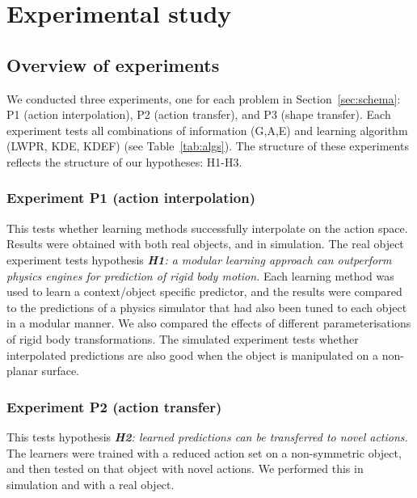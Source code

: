 
\newlength{\barchartwidth}
\setlength{\barchartwidth}{6.5cm}

\section{Experimental study}\label{sec:Experiment}

\subsection{Overview of experiments}\label{sec:Experiment.Overview}

We conducted three experiments, one for each problem in Section~\ref{sec:schema}: P1 (action interpolation), P2 (action transfer), and P3
(shape transfer). Each experiment tests all combinations of information (G,A,E) and learning algorithm (LWPR, KDE, KDEF) (see Table~\ref{tab:algs}). The structure of these experiments reflects the structure of our hypotheses: H1-H3.

\subsubsection{Experiment P1 (action interpolation)} This tests whether learning methods successfully interpolate on the action space. Results were obtained with both real objects, and in simulation. The  real object experiment tests hypothesis {\em {\bf H1}: a modular learning approach can outperform physics engines for prediction of rigid body motion.} Each learning method was used to learn a context/object specific predictor, and the results were compared to the predictions of a physics simulator that had also been tuned to each object in a modular manner. We also compared the effects of different parameterisations of rigid body transformations. The simulated experiment tests whether interpolated predictions are also good when the object is manipulated on a non-planar surface. 

\subsubsection{Experiment P2 (action transfer)} This tests hypothesis {\em {\bf H2}: learned predictions can be transferred to novel actions.} The learners were trained with a reduced action set on a non-symmetric object, and then tested on that object with novel actions. We performed this in simulation and with a real object.

